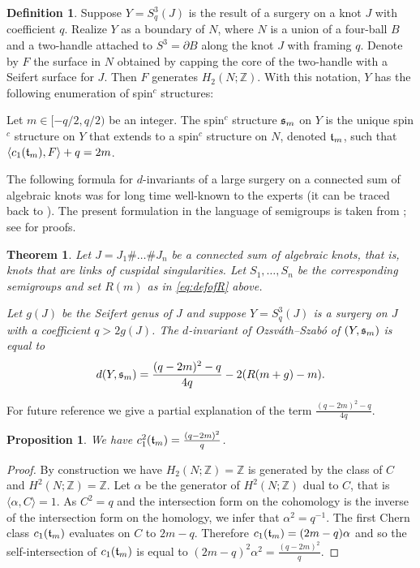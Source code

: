 \documentclass[11pt]{amsart}
\numberwithin{equation}{section}
\theoremstyle{plain}
\newtheorem{theorem}[equation]{Theorem}
\newtheorem{proposition}[equation]{Proposition}
\theoremstyle{definition}
\newtheorem{definition}[equation]{Definition}
\begin{document}
\begin{definition}
Suppose $Y=S^3_q(J)$ is the result of a surgery on a knot $J$ with coefficient $q$. Realize $Y$ as a boundary of $N$, where
$N$ is a union of a four-ball $B$ and a two-handle attached to $S^3=\partial B$ along the knot $J$ with
framing $q$. Denote by $F$ the surface in $N$ obtained by capping the core of the two-handle with a Seifert surface for $J$.
Then $F$ generates $H_2(N;{\mathbb Z})$. With this notation, $Y$
has the following 
enumeration of {spin$^c$}{} structures:

Let $m\in[-q/2,q/2)$ be an integer. The {spin$^c$}{} structure ${\ifmmode{{\mathfrak s}}\else{${\mathfrak s}$\ }\fi}_m$ on $Y$ is the unique {spin$^c$}{} structure on $Y$ that extends to a {spin$^c$}{}
structure on $N$, denoted ${\ifmmode{{\mathfrak t}}\else{${\mathfrak t}$\ }\fi}_m$, such that $\langle c_1({\ifmmode{{\mathfrak t}}\else{${\mathfrak t}$\ }\fi}_m),F\rangle+q=2m$.
\end{definition}

The following formula for $d$-invariants of a large surgery on a connected sum of algebraic knots was for long time well-known to the
experts (it can be traced back to \cite[Section 8.1]{OS-absolute}). The present
formulation in the language of semigroups is
taken from \cite[Proposition 3.7]{BM}; see \cite{BL} for proofs.
\begin{theorem}\label{thm:compute}
Let $J=J_1\#\ldots\#J_n$ be a connected sum of algebraic knots, that is, knots that are links of cuspidal singularities. 
Let $S_1,\ldots,S_n$ be the corresponding semigroups and set $R(m)$ as in \eqref{eq:defofR} above.

Let $g(J)$ be the Seifert genus of $J$ and suppose $Y=S^3_q(J)$ is a surgery on $J$ with a coefficient $q>2g(J)$.
The $d$-invariant of Ozsv\'ath--Szab\'o of $(Y,{\ifmmode{{\mathfrak s}}\else{${\mathfrak s}$\ }\fi}_m)$ is equal to
\[d(Y,{\ifmmode{{\mathfrak s}}\else{${\mathfrak s}$\ }\fi}_m)=\frac{(q-2m)^2-q}{4q}-2(R(m+g)-m).\]
\end{theorem}

For future reference we give a partial explanation of the term $\frac{(q-2m)^2-q}{4q}$.
\begin{proposition}\label{prop:c1square}
We have $c_1^2({\ifmmode{{\mathfrak t}}\else{${\mathfrak t}$\ }\fi}_m)=\frac{(q-2m)^2}{q}$.
\end{proposition}
\begin{proof}
By construction we have $H_2(N;{\mathbb Z})={\mathbb Z}$ is generated by the class of $C$ and $H^2(N;{\mathbb Z})={\mathbb Z}$. Let $\alpha$ be the generator of $H^2(N;{\mathbb Z})$ dual
to $C$, that is $\langle \alpha,C\rangle=1$. 
As $C^2=q$ and the intersection form on the cohomology is the inverse of the intersection form on the homology, we infer that
$\alpha^2=q^{-1}$.
The first Chern class $c_1({\ifmmode{{\mathfrak t}}\else{${\mathfrak t}$\ }\fi}_m)$ evaluates on $C$ to $2m-q$. Therefore $c_1({\ifmmode{{\mathfrak t}}\else{${\mathfrak t}$\ }\fi}_m)=(2m-q)\alpha$ and so 
the self-intersection
of $c_1({\ifmmode{{\mathfrak t}}\else{${\mathfrak t}$\ }\fi}_m)$ is equal to $(2m-q)^2\alpha^2=\frac{(q-2m)^2}{q}$.
\end{proof}
\end{document}
